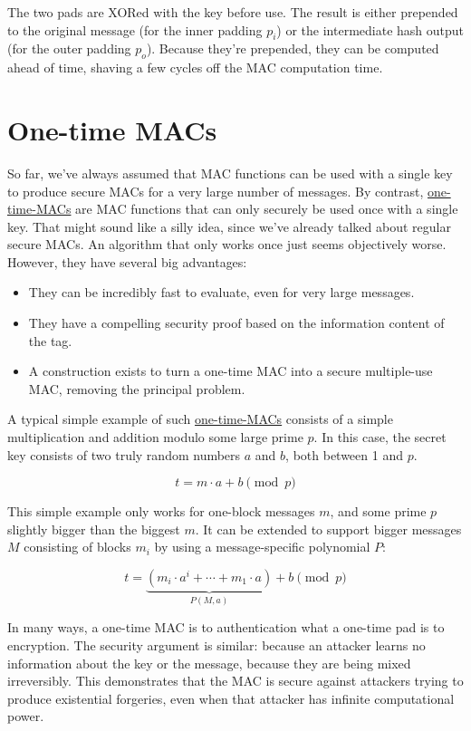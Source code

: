 \documentclass[11pt,ebook,table,dvipsnames]{memoir}
\begin{document}
The two pads are XORed with the key before use. The result is either
prepended to the original message (for the inner padding $p_i$) or the
intermediate hash output (for the outer padding $p_o$). Because
they're prepended, they can be computed ahead of time, shaving a few
cycles off the MAC computation time.
\section{\label{One-time-MACs}One-time MACs}
\label{sec-2-7-5}

So far, we've always assumed that MAC functions can be used with a
single key to produce secure MACs for a very large number of messages.
By contrast, \hyperref[One-time MACs]{one-time-MACs} are MAC functions that can only securely be
used once with a single key. That might sound like a silly idea, since
we've already talked about regular secure MACs. An algorithm that only
works once just seems objectively worse. However, they have several big
advantages:

\begin{itemize}
\item They can be incredibly fast to evaluate, even for very large
messages.
\item They have a compelling security proof based on the information
content of the tag.
\item A construction exists to turn a one-time MAC into a secure
multiple-use MAC, removing the principal problem.
\end{itemize}

A typical simple example of such \hyperref[One-time MACs]{one-time-MACs} consists of a simple
multiplication and addition modulo some large prime $p$. In this case,
the secret key consists of two truly random numbers $a$ and $b$, both
between 1 and $p$.

\[
t = m \cdot a + b \pmod p
\]

This simple example only works for one-block messages $m$, and some
prime $p$ slightly bigger than the biggest $m$. It can be extended to
support bigger messages $M$ consisting of blocks $m_i$ by using a
message-specific polynomial $P$:

\[
t = \underbrace{(m_i \cdot a^i + \cdots + m_1 \cdot a)}_{P(M, a)} + b \pmod p
\]

In many ways, a one-time MAC is to authentication what a one-time pad
is to encryption. The security argument is similar: because an
attacker learns no information about the key or the message, because
they are being mixed irreversibly. This demonstrates that the MAC is
secure against attackers trying to produce existential forgeries, even
when that attacker has infinite computational power.
\end{document}
